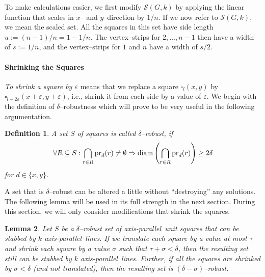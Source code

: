 \documentclass[12pt]{article}
\newtheorem{definition}{Definition}
\newtheorem{lemma}[definition]{Lemma}
\newcommand{\eps}{\varepsilon}
\newcommand{\ap}{a.p.\ }
\renewcommand{\ap}{axis-parallel\ }
\newcommand{\calS}{\mathcal{S}}
\newcommand{\diam}{\operatorname{diam}}
\newcommand{\follows}{\Rightarrow}
\begin{document}
To make calculations easier, we first modify $\calS(G, k)$ by applying the linear function that scales in $x$-- and $y$--direction by $1/n$. If we now refer to $\calS(G, k)$, we mean the scaled set. All the squares in this set have side length $u := (n - 1)/n = 1 - 1/n$. The vertex--strips for $2, \dots, n-1$ then have a width of $s := 1/n$, and the vertex--strips for $1$ and $n$ have a width of $s/2$. 

\paragraph{Shrinking the Squares}
\emph{To shrink a square by $\eps$} means that we replace a square $\square_l(x, y)$ by $\square_{l - 2\eps}(x + \eps, y + \eps)$, i.e., shrink it from each side by a value of $\eps$. We begin with the definition of $\delta$--robustness which will prove to be very useful in the following argumentation.
\begin{definition} A set $S$ of squares is called \textit{$\delta$--robust}, if
\[ \forall R \subseteq S: \bigcap_{r \in R}\pr_d(r) \neq \emptyset \follows \diam\left(\bigcap_{r \in R}\pr_d(r)\right) \geq 2\delta \]
for $d \in \{x, y\}$.
\end{definition}
A set that is $\delta$--robust can be altered a little without ``destroying'' any solutions. The following lemma will be used in its full strength in the next section. During this section, we will only consider modifications that shrink the squares. 
\begin{lemma}\label{Lemma:DeltaRobust} Let $S$ be a $\delta$--robust set of \ap unit squares that can be stabbed by $k$ \ap lines. If we translate each square by a value at most $\tau$ and shrink each square by a value $\sigma$ such that $\tau + \sigma < \delta$, then the resulting set still can be stabbed by $k$ \ap lines. Further, if all the squares are shrinked by $\sigma < \delta$ (and not translated), then the resulting set is $(\delta - \sigma)$--robust.
\end{lemma}
\end{document}
